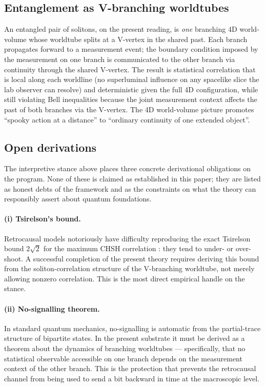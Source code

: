\subsection{Entanglement as V-branching worldtubes}

An entangled pair of solitons, on the present reading, is \emph{one} branching 4D world-volume whose worldtube splits at a V-vertex in the shared past.
Each branch propagates forward to a measurement event; the boundary condition imposed by the measurement on one branch is communicated to the other branch via continuity through the shared V-vertex.
The result is statistical correlation that is local along each worldline (no superluminal influence on any spacelike slice the lab observer can resolve) and deterministic given the full 4D configuration, while still violating Bell inequalities because the joint measurement context affects the past of both branches via the V-vertex.
The 4D world-volume picture promotes ``spooky action at a distance'' to ``ordinary continuity of one extended object''.

\subsection{Open derivations}
\label{subsec:bell-open}

The interpretive stance above places three concrete derivational obligations on the program.
None of these is claimed as established in this paper; they are listed as honest debts of the framework and as the constraints on what the theory can responsibly assert about quantum foundations.

\paragraph{(i) Tsirelson's bound.}
Retrocausal models notoriously have difficulty reproducing the exact Tsirelson bound $2\sqrt{2}$ for the maximum CHSH correlation \citep{Cirelson1980}: they tend to under- or over-shoot.
A successful completion of the present theory requires deriving this bound from the soliton-correlation structure of the V-branching worldtube, not merely allowing nonzero correlation.
This is the most direct empirical handle on the stance.

\paragraph{(ii) No-signalling theorem.}
In standard quantum mechanics, no-signalling is automatic from the partial-trace structure of bipartite states.
In the present substrate it must be derived as a theorem about the dynamics of branching worldtubes --- specifically, that no statistical observable accessible on one branch depends on the measurement context of the other branch.
This is the protection that prevents the retrocausal channel from being used to send a bit backward in time at the macroscopic level.

